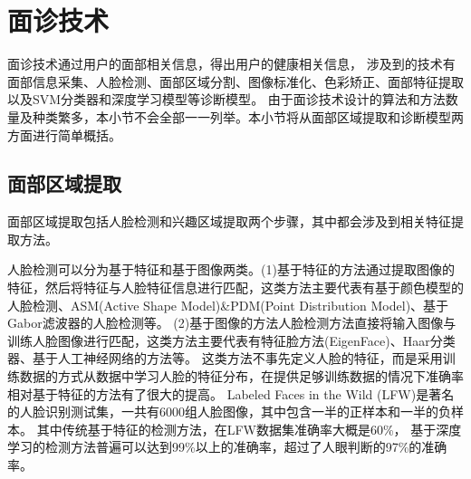 \section{面诊技术}
面诊技术通过用户的面部相关信息，得出用户的健康相关信息，
涉及到的技术有面部信息采集、人脸检测、面部区域分割、图像标准化、色彩矫正、面部特征提取以及SVM分类器和深度学习模型等诊断模型\cite{宋海贝2018中医面诊信息自动识别方法研究进展, 林锋2019中医面诊系统调研报告}。
由于面诊技术设计的算法和方法数量及种类繁多，本小节不会全部一一列举。本小节将从面部区域提取和诊断模型两方面进行简单概括。

\subsection{面部区域提取}
面部区域提取包括人脸检测和兴趣区域提取两个步骤，其中都会涉及到相关特征提取方法。

人脸检测可以分为基于特征和基于图像两类。(1)基于特征的方法通过提取图像的特征，然后将特征与人脸特征信息进行匹配，这类方法主要代表有基于颜色模型的人脸检测\cite{dhivakar2015face}、ASM(Active Shape Model)\&PDM(Point Distribution Model)\cite{kumar2019face}、基于Gabor滤波器的人脸检测\cite{sharif2011face}等。
(2)基于图像的方法人脸检测方法直接将输入图像与训练人脸图像进行匹配，这类方法主要代表有特征脸方法(EigenFace)\cite{mulyono2019performance}、Haar分类器\cite{priadana2019face}、基于人工神经网络\cite{farfade2015multi}的方法等。
这类方法不事先定义人脸的特征，而是采用训练数据的方式从数据中学习人脸的特征分布，在提供足够训练数据的情况下准确率相对基于特征的方法有了很大的提高。
Labeled Faces in the Wild (LFW)是著名的人脸识别测试集，一共有6000组人脸图像，其中包含一半的正样本和一半的负样本。
其中传统基于特征的检测方法，在LFW数据集准确率大概是60\%， 基于深度学习的检测方法普遍可以达到99\%以上的准确率，超过了人眼判断的97\%的准确率\cite{sun2015deeply}。





